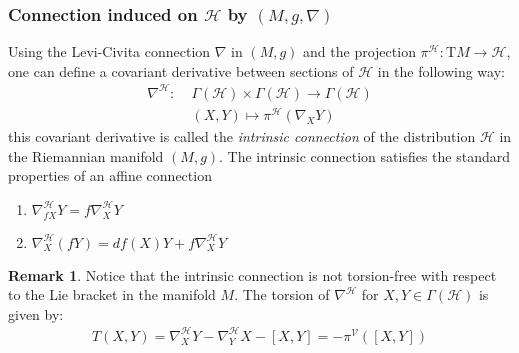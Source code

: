 \documentclass[12pt]{article}
\theoremstyle{definition}
\newtheorem{remark}{Remark}[subsection]
\numberwithin{equation}{subsection}
\begin{document}
\subsubsection{Connection induced on $\mathcal{H}$ by $(M , g, \nabla)$}
Using the Levi-Civita connection $\nabla$ in $(M,g)$ and the projection $\pi^\mathcal{H}: \text{T}M \rightarrow \mathcal{H}$, one can define a covariant derivative between sections of $\mathcal{H}$ in the following way:
\begin{align*}
    \nabla^\mathcal{H}:\; &\Gamma(\mathcal{H}) \times \Gamma(\mathcal{H}) \rightarrow \Gamma(\mathcal{H}) \\
    &(X , Y) \mapsto \pi^\mathcal{H} (\nabla_X Y)
\end{align*}
this covariant derivative is called the \textit{intrinsic connection} of the distribution $\mathcal{H}$ in the Riemannian manifold $(M , g)$. The intrinsic connection satisfies the standard properties of an affine connection
\begin{enumerate}
    \item $\nabla^\mathcal{H}_{f X}Y = f\nabla^\mathcal{H}_{X}Y$
    \item $\nabla^\mathcal{H}_X( f Y) = df(X) Y + f \nabla^\mathcal{H}_X Y$
\end{enumerate}
\begin{remark}
Notice that the intrinsic connection is not torsion-free with respect to the Lie bracket in the manifold $M$. The torsion of $\nabla^\mathcal{H}$ for $X,Y \in \Gamma(\mathcal{H})$ is given by:
\begin{align*}
    T(X,Y) = \nabla^\mathcal{H}_X Y - \nabla^\mathcal{H}_Y X - [X ,Y] = -\pi^\mathcal{V}([X, Y])
\end{align*}
\end{remark}

\end{document}

